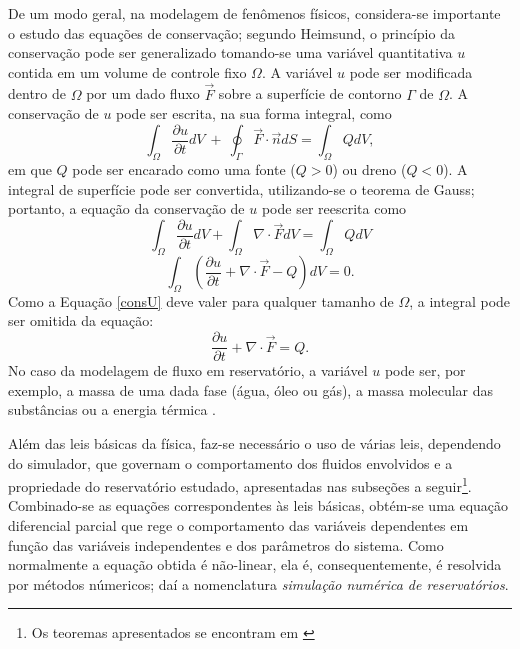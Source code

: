 De um modo geral, na modelagem de fen\^{o}menos f\'{i}sicos, considera-se importante o estudo das equa\c{c}\~{o}es de conserva\c{c}\~{a}o; segundo Heimsund, o princ\'{i}pio da conserva\c{c}\~{a}o pode ser generalizado tomando-se uma vari\'{a}vel quantitativa $u$ contida em um volume de controle fixo $\Omega$. A vari\'{a}vel $u$ pode ser modificada dentro de $\Omega$ por um dado fluxo $\vec{F}$ sobre a superf\'{i}cie de contorno $\Gamma$ de $\Omega$. A conserva\c{c}\~{a}o de $u$ pode ser escrita, na sua forma integral, como
\begin{equation}
	\int_{\Omega} \frac{\partial u}{\partial t}dV ~+~\oint_{\Gamma}\vec{F}\cdot\vec{n}dS = \int_{\Omega} Q dV,
\end{equation}
em que $Q$ pode ser encarado como uma fonte ($Q > 0$) ou dreno ($Q < 0$). A integral de superf\'{i}cie pode ser convertida, utilizando-se o teorema de Gauss; portanto, a equa\c{c}\~{a}o da conserva\c{c}\~{a}o de $u$ pode ser reescrita como
\begin{equation}
\int_{\Omega} \frac{\partial u}{\partial t}dV + \int_{\Omega} \nabla\cdot\vec{F} dV = \int_{\Omega}Q dV
\end{equation}
\begin{equation}\label{consU}
\int_{\Omega} \left(\frac{\partial u}{\partial t} + \nabla\cdot\vec{F} - Q \right)dV = 0.
\end{equation}
Como a Equa\c{c}\~{a}o \eqref{consU} deve valer para qualquer tamanho de $\Omega$, a integral pode ser omitida da equa\c{c}\~{a}o:
\begin{equation}\label{consU2}
\frac{\partial u}{\partial t} + \nabla\cdot\vec{F} = Q.
\end{equation}
No caso da modelagem de fluxo em reservat\'{o}rio, a vari\'{a}vel $u$ pode ser, por exemplo, a massa de uma dada fase (\'{a}gua, \'{o}leo ou g\'{a}s), a massa molecular das subst\^{a}ncias ou a energia t\'{e}rmica \cite{heimsund2005}.

Al\'{e}m das leis b\'{a}sicas da f\'{i}sica, faz-se necess\'{a}rio o uso de v\'{a}rias leis, dependendo do simulador, que governam o comportamento dos fluidos envolvidos e a propriedade do reservat\'{o}rio estudado, apresentadas nas subse\c{c}\~{o}es a seguir\footnote{Os teoremas apresentados se encontram em \cite[pp. 520-522]{engres}}. Combinado-se as equa\c{c}\~{o}es correspondentes \`{a}s leis b\'{a}sicas, obt\'{e}m-se uma equa\c{c}\~{a}o diferencial parcial que rege o comportamento das vari\'{a}veis dependentes em fun\c{c}\~{a}o das vari\'{a}veis independentes e dos par\^{a}metros do sistema. Como normalmente a equa\c{c}\~{a}o obtida \'{e} n\~{a}o-linear, ela \'{e}, consequentemente, \'{e} resolvida por m\'{e}todos n\'{u}mericos; da\'{i} a nomenclatura \textit{simula\c{c}\~{a}o num\'{e}rica de reservat\'{o}rios}. 


